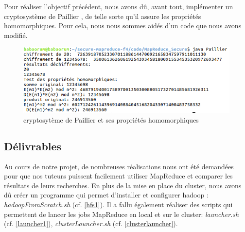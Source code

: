 Pour réaliser l'objectif précédent, nous avons dû, avant tout, implémenter un cryptosystème de Paillier \cite{code-Paillier}, de telle sorte qu'il assure les propriétés homomorphiques.
Pour cela, nous nous sommes aidés d'un code \cite{code-Paillier} que nous avons modifié.

\begin{figure}[H]
\centering
\includegraphics[scale=0.4]{img/res-paillier.png}
\caption{cryptosytème de Paillier et ses propriétés homomorphiques}
\label{Paillier}
\end{figure}



	\subsection{Délivrables}

Au cours de notre projet, de nombreuses réalisations nous ont été demandées pour que nos tuteurs puissent facilement utiliser MapReduce et comparer les résultats de leurs recherches. 
En plus de la mise en place du cluster, nous avons dû créer un programme qui permet d'installer et configurer hadoop : \textit{hadoopFromScratch.sh} (cf. \ref{hfs1}).
Il a fallu également réaliser des scripts qui permettent de lancer les jobs MapReduce en local et sur le cluster: \textit{launcher.sh} (cf. \ref{launcher1}), \textit{clusterLauncher.sh} (cf. \ref{clusterlauncher}).

 
